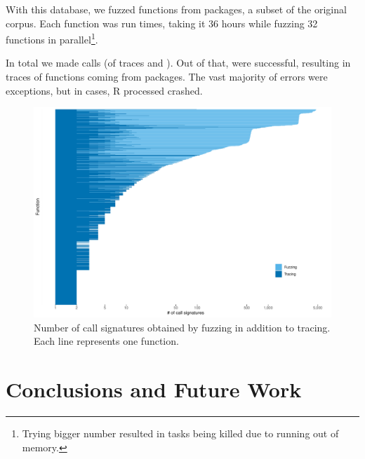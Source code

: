 \documentclass[sigplan,anonymous,review]{acmart}
\begin{document}
With this database, we fuzzed \UFNumFunctions functions from \UFNumPackages packages, a subset of the original corpus.
Each function was run \UFTracingBudget times, taking it 36 hours while fuzzing 32 functions in parallel\footnote{Trying bigger number resulted in tasks being killed due to running out of memory.}.

In total we made \UFNumTracesRnd calls (\UFTracesSize of traces and \UFTracesReturnDbsSize). Out of that, \UFRatioSuccessTraces were successful, resulting in \UFNumSuccessTraces traces of \UFNumSuccessFunctions functions coming from \UFNumSuccessPackages packages.
The vast majority of errors were exceptions, but in \UFNumOfCrashedRSessions cases, R processed crashed.






\begin{figure}
    \centering
    \includegraphics[width=\columnwidth]{code-and-figures/uf-call-signatures.pdf}
    \caption{
        Number of call signatures obtained by fuzzing in addition to tracing. Each line represents one function.
    }\label{fig:call-signatures}
\end{figure}

\section{Conclusions and Future Work}
\label{sec:conclusions}
\end{document}
